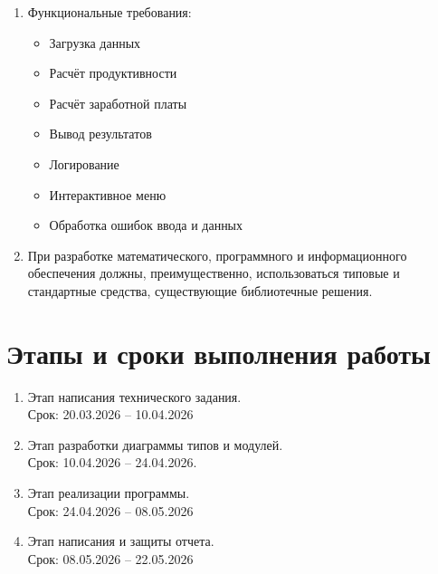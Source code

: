 \documentclass[a4paper, 14pt]{extarticle} %
\begin{document}
\begin{enumerate}[label=\alph*.]
\begin{itemize}
                    \item Корректная работа под управлением операционных систем семейства Linux, macOS, Windows (при наличии компилятора GHC).
                \end{itemize}
            \item Функциональные требования: 
                \begin{itemize}
                    \item Загрузка данных
                    \item Расчёт продуктивности
                    \item Расчёт заработной платы
                    \item Вывод результатов
                    \item Логирование
                    \item Интерактивное меню
                    \item Обработка ошибок ввода и данных
                \end{itemize}
            \item При разработке математического, программного и информационного обеспечения должны, преимущественно, использоваться типовые и стандартные средства, существующие библиотечные решения.
        \end{enumerate}

    \section{Этапы и сроки выполнения работы}
        \begin{enumerate}[label=\alph*.]
            \item Этап написания технического задания. \\ Срок: 20.03.2026 – 10.04.2026 
            \item Этап разработки диаграммы типов и модулей. \\ Срок: 10.04.2026 – 24.04.2026.
            \item Этап реализации программы. \\ 
            Срок: 24.04.2026 – 08.05.2026 
            \item Этап написания и защиты отчета. \\ Срок: 08.05.2026 – 22.05.2026
        \end{enumerate}
\end{document}
